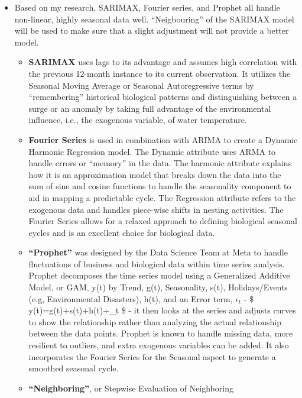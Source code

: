 \documentclass[
  letterpaper,
  DIV=11,
  numbers=noendperiod]{scrartcl}
\begin{document}
\begin{itemize}
\item
  Based on my research, SARIMAX, Fourier series, and Prophet all handle
  non-linear, highly seasonal data well. ``Neigbouring'' of the SARIMAX
  model will be used to make sure that a slight adjustment will not
  provide a better model.

  \begin{itemize}
  \item
    \textbf{SARIMAX} uses lags to its advantage and assumes high
    correlation with the previous 12-month instance to its current
    observation. It utilizes the Seasonal Moving Average or Seasonal
    Autoregressive terms by ``remembering'' historical biological
    patterns and distinguishing between a surge or an anomaly by taking
    full advantage of the environmental influence, i.e., the exogenous
    variable, of water temperature.
  \item
    \textbf{Fourier Series} is used in combination with ARIMA to create
    a Dynamic Harmonic Regression model. The Dynamic attribute uses ARMA
    to handle errors or ``memory'' in the data. The harmonic attribute
    explains how it is an approximation model that breaks down the data
    into the sum of sine and cosine functions to handle the seasonality
    component to aid in mapping a predictable cycle. The Regression
    attribute refers to the exogenous data and handles piece-wise shifts
    in nesting activities. The Fourier Series allows for a relaxed
    approach to defining biological seasonal cycles and is an excellent
    choice for biological data.
  \item
    \textbf{``Prophet''} was designed by the Data Science Team at Meta
    to handle fluctuations of business and biological data within time
    series analysis. Prophet decomposes the time series model using a
    Generalized Additive Model, or GAM, y(t) by Trend, g(t),
    Seasonality, s(t), Holidays/Events (e.g, Environmental Disasters),
    h(t), and an Error term, \(\epsilon_t\) - \$
    y(t)=g(t)+s(t)+h(t)+\epsilon\_t \$ - it then looks at the series and
    adjusts curves to show the relationship rather than analyzing the
    actual relationship between the data points. Prophet is known to
    handle missing data, more resilient to outliers, and extra exogenous
    variables can be added. It also incorporates the Fourier Series for
    the Seasonal aspect to generate a smoothed seasonal cycle.
  \item
    \textbf{``Neighboring''}, or Stepwise Evaluation of Neighboring

\end{itemize}
\end{itemize}
\end{document}
